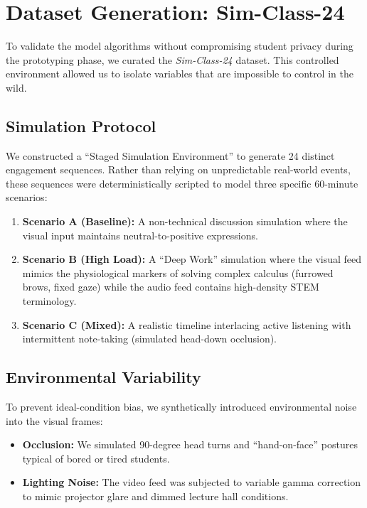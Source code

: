 \documentclass[conference]{IEEEtran}
\begin{document}
\section{Dataset Generation: Sim-Class-24}

To validate the model algorithms without compromising student privacy during the prototyping phase, we curated the \textit{Sim-Class-24} dataset. This controlled environment allowed us to isolate variables that are impossible to control in the wild.

\subsection{Simulation Protocol}
We constructed a ``Staged Simulation Environment'' to generate 24 distinct engagement sequences. Rather than relying on unpredictable real-world events, these sequences were deterministically scripted to model three specific 60-minute scenarios:
\begin{enumerate}
    \item \textbf{Scenario A (Baseline):} A non-technical discussion simulation where the visual input maintains neutral-to-positive expressions.
    \item \textbf{Scenario B (High Load):} A ``Deep Work'' simulation where the visual feed mimics the physiological markers of solving complex calculus (furrowed brows, fixed gaze) while the audio feed contains high-density STEM terminology.
    \item \textbf{Scenario C (Mixed):} A realistic timeline interlacing active listening with intermittent note-taking (simulated head-down occlusion).
\end{enumerate}

\subsection{Environmental Variability}
To prevent ideal-condition bias, we synthetically introduced environmental noise into the visual frames:
\begin{itemize}
    \item \textbf{Occlusion:} We simulated 90-degree head turns and ``hand-on-face'' postures typical of bored or tired students.
    \item \textbf{Lighting Noise:} The video feed was subjected to variable gamma correction to mimic projector glare and dimmed lecture hall conditions.
\end{itemize}
\end{document}

